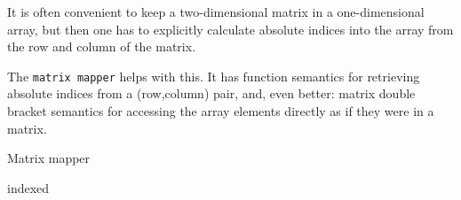It is often convenient to keep a two-dimensional matrix in a one-dimensional
array, but then one has to explicitly calculate absolute indices into the
array from the row and column of the matrix.

The {\tt matrix mapper} helps with this.
It has function semantics for retrieving absolute indices from a (row,column)
pair, and, even better: matrix double bracket semantics for accessing the
array elements directly as if they were in a matrix.
\begin{algorithm}{Matrix mapper}
\end{algorithm}

\begin{algorithm}{indexed}
\end{algorithm}


\begin{sourceslandscape}
\end{sourceslandscape}
